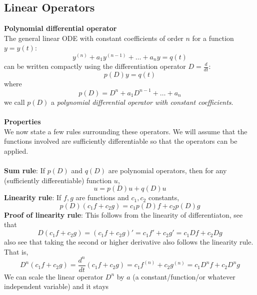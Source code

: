 \documentclass{report}
\begin{document}
\subsection{Linear Operators}
\textbf{Polynomial differential operator}\\
The general linear ODE with constant coefficients of order $n$ for a function $y=y(t)$:
\begin{equation*}
y^{(n)}+a_1y^{(n-1)}+\ldots+a_ny=q(t)
\end{equation*}
can be written compactly using the differentiation operator $D=\frac{d}{dt}$:
\begin{equation*}
p(D)y=q(t)
\end{equation*}
where
\begin{equation*}
p(D)=D^n+a_1D^{n-1}+\ldots+a_n
\end{equation*}
we call $p(D)$ a \textit{polynomial differential operator with constant coefficients}.\\
\vspace{1mm}\\
\textbf{Properties}\\
We now state a few rules surrounding these operators. We will assume that the functions involved are sufficiently
differentiable so that the operators can be applied.\\
\vspace{1mm}\\
\textbf{Sum rule}: If $p(D)$ and $q(D)$ are polynomial operators, then for any (sufficiently differentiable) 
function $u$,
\begin{equation*}
[p(D)+q(D)]u=p(D)u+q(D)u
\end{equation*}
\textbf{Linearity rule}: If $f,g$ are functions and $c_1,c_2$ constants,
\begin{equation*}
p(D)(c_1f+c_2g)=c_1p(D)f+c_2p(D)g
\end{equation*}
\textbf{Proof of linearity rule}: This follows from the linearity of differentiaton, see that
\begin{equation*}
D(c_1f+c_2g)=(c_1f+c_2g)'=c_1f'+c_2g'=c_1Df+c_2Dg
\end{equation*}
also see that taking the second or higher derivative also follows the linearity rule. That is,
\begin{equation*}
D^n(c_1f+c_2g)=\frac{d^n}{dt}(c_1f+c_2g)=c_1f^{(n)}+c_2g^{(n)}=c_1D^nf+c_2D^ng
\end{equation*}
We can scale the linear operator $D^n$ by $a$ (a constant/function/or whatever independent variable) and it stays
\end{document}
